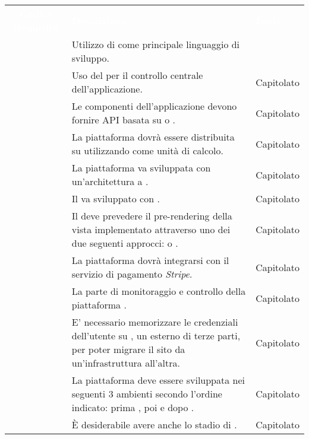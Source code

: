 \renewcommand{\arraystretch}{1.5}
\begin{longtable}{|c C{9.5cm} C{2.5cm}|} 
	
	\textcolor{white}{\textbf{Codice Requisito}}&
	\textcolor{white}{\textbf{Descrizione}}&
	\textcolor{white}{\textbf{Fonte}}\\
	
	 & Utilizzo di  come principale linguaggio di sviluppo. &  \\
	
	 & Uso del   per il controllo centrale dell'applicazione. & Capitolato \\
	
	 & Le componenti dell'applicazione devono fornire API basata su  o . & Capitolato \\
	
	 & La piattaforma dovrà essere distribuita su  utilizzando  come unità di calcolo. & Capitolato \\
	
	 & La piattaforma va sviluppata con un'architettura a . & Capitolato \\
	
	 & Il  va sviluppato con . & Capitolato \\
	
	 & Il  deve prevedere il pre-rendering della vista  implementato attraverso uno dei due seguenti approcci:  o . & Capitolato \\
	
	 & La piattaforma dovrà integrarsi con il servizio di pagamento \textit{Stripe}. & Capitolato \\
	
	 & La parte di monitoraggio e controllo della piattaforma . & Capitolato \\
	
	 & E' necessario memorizzare le credenziali dell'utente su , un  esterno di terze parti, per poter migrare il sito da un'infrastruttura all'altra. & Capitolato \\
	
	 & La piattaforma deve essere sviluppata nei seguenti 3 ambienti secondo l'ordine indicato: prima , poi  e dopo . & Capitolato \\
	
	 & È desiderabile avere anche lo stadio di . & Capitolato \\
	
\end{longtable}
